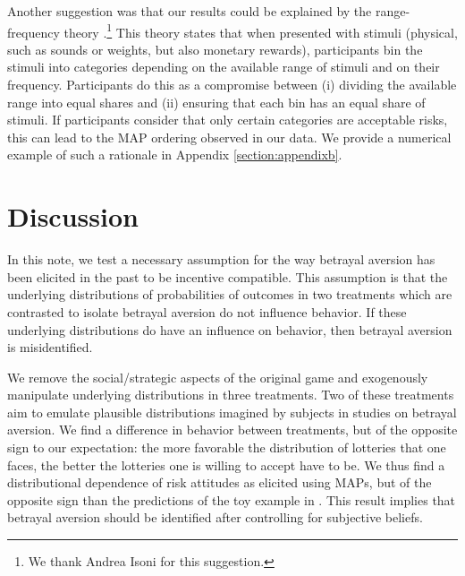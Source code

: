 Another suggestion was that our results could be explained by the range-frequency theory \citep{Parducci1965,Parducci1971}.\footnote{
We thank Andrea Isoni for this suggestion.
}
This theory states that when presented with stimuli (physical, such as sounds or weights, but also monetary rewards), participants bin the stimuli into categories depending on the available range of stimuli and on their frequency.
Participants do this as a compromise between (i) dividing the available range into equal shares and (ii) ensuring that each bin has an equal share of stimuli.
If participants consider that only certain categories are acceptable risks, this can lead to the MAP ordering observed in our data.
We provide a numerical example of such a rationale in Appendix \ref{section:appendixb}.


\section{Discussion}\label{sec:discussion}
In this note, we test a necessary assumption for the way betrayal aversion has been elicited in the past to be incentive compatible.
This assumption is that the underlying distributions of probabilities of outcomes in two treatments which are contrasted to isolate betrayal aversion do not influence behavior.
If these underlying distributions do have an influence on behavior, then betrayal aversion is misidentified.

We remove the social/strategic aspects of the original game and exogenously manipulate underlying distributions in three treatments.
Two of these treatments aim to emulate plausible distributions imagined by subjects in studies on betrayal aversion.
%
We find a difference in behavior between treatments, but of the opposite sign to our expectation: the more favorable the distribution of lotteries that one faces, the better the lotteries one is willing to accept have to be.
We thus find a distributional dependence of risk attitudes as elicited using MAPs, but of the opposite sign than the predictions of the toy example in \cite{Li2020a}.
This result implies that betrayal aversion should be identified after controlling for subjective beliefs.

